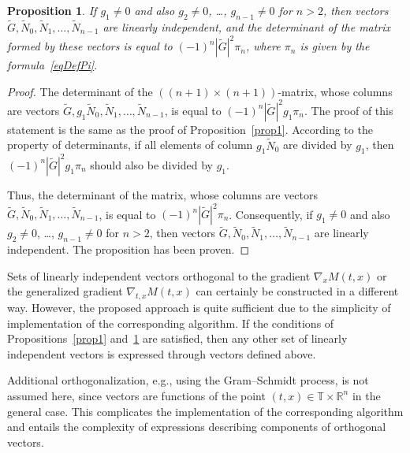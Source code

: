 \documentclass[10pt,reqno]{amsart}
\theoremstyle{plain}
\newtheorem{Proposition}{Proposition}
\theoremstyle{remark}
\begin{document}
\begin{Proposition}\label{prop2}
If $g_1 \neq 0$ and also $g_2 \neq 0$, \dots, $g_{n-1} \neq 0$ for $n > 2$, then vectors $\tilde G,\tilde N_0,\tilde N_1,\dots,\tilde N_{n-1}$ are linearly independent, and the determinant of the matrix formed by these vectors is equal to $(-1)^n |\tilde G|^2 \pi_n$, where $\pi_n$ is given by the formula~\eqref{eqDefPi}.
\end{Proposition}

\begin{proof}
The determinant of the $((n+1) \times (n+1))$-matrix, whose columns are vectors $\tilde G,g_1 \tilde N_0,\tilde N_1,\dots,\tilde N_{n-1}$, is equal to $(-1)^n |\tilde G|^2 g_1 \pi_n$. The proof of this statement is the same as the proof of Proposition~\ref{prop1}. According to the property of determinants, if all elements of column $g_1 \tilde N_0$ are divided by $g_1$, then $(-1)^n |\tilde G|^2 g_1 \pi_n$ should also be divided by $g_1$.

Thus, the determinant of the matrix, whose columns are vectors $\tilde G,\tilde N_0,\tilde N_1,\dots,\tilde N_{n-1}$, is equal to $(-1)^n |\tilde G|^2 \pi_n$. Consequently, if $g_1 \neq 0$ and also $g_2 \neq 0$, \dots, $g_{n-1} \neq 0$ for $n > 2$, then vectors $\tilde G,\tilde N_0,\tilde N_1,\dots,\tilde N_{n-1}$ are linearly independent. The proposition has been proven.
\end{proof}

Sets of linearly independent vectors orthogonal to the gradient $\nabla_x M(t,x)$ or the generalized gradient $\nabla_{t,x} M(t,x)$ can certainly be constructed in a different way. However, the proposed approach is quite sufficient due to the simplicity of implementation of the corresponding algorithm. If the conditions of Propositions~\ref{prop1} and~\ref{prop2} are satisfied, then any other set of linearly independent vectors is expressed through vectors defined above.

Additional orthogonalization, e.g., using the Gram--Schmidt process, is not assumed here, since vectors are functions of the point $(t,x) \in \mathds{T} \times \mathds{R}^n$ in the general case. This complicates the implementation of the corresponding algorithm and entails the complexity of expressions describing components of orthogonal vectors.
\end{document}
